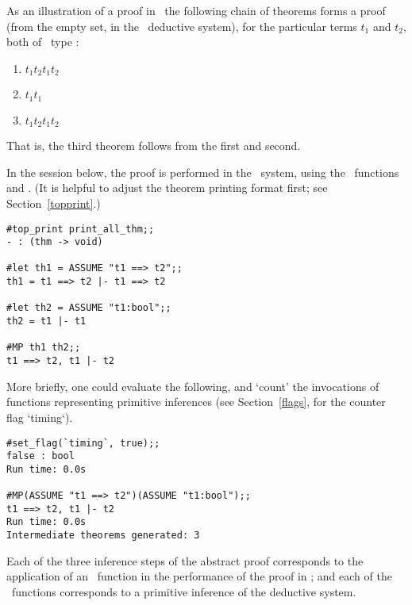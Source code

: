 As an illustration of a proof in \HOL\, the following chain of theorems
forms a proof (from the empty set, in the
\HOL\ deductive system), for the particular terms $t_1$ and $t_2$, both of \HOL\ type :

\begin{enumerate}
\item $t_1$\ml{ ==> }$t_2$\ml{ |- }$t_1$\ml{ ==> }$t_2$

\item $t_1$\ml{ |- }$t_1$

\item $t_1$\ml{ ==> }$t_2$\ml{, }$t_1$\ml{ |- }$t_2$
\end{enumerate}

\noindent That is, the third theorem follows from the first and second.

In the session below, the proof is performed in the \HOL\ system, 
using the \ML\ functions  and . (It is helpful to
adjust the theorem printing format first; see Section~\ref{topprint}.)

\setcounter{sessioncount}{1}
\begin{session}\begin{verbatim}
#top_print print_all_thm;;
- : (thm -> void)

#let th1 = ASSUME "t1 ==> t2";;
th1 = t1 ==> t2 |- t1 ==> t2

#let th2 = ASSUME "t1:bool";;
th2 = t1 |- t1

#MP th1 th2;;
t1 ==> t2, t1 |- t2
\end{verbatim}\end{session}

\noindent More briefly, one could evaluate the following, and `count' the
invocations of functions representing primitive inferences
(see Section~\ref{flags}, for the counter flag `timing`).

\begin{session}\begin{verbatim}
#set_flag(`timing`, true);;
false : bool
Run time: 0.0s

#MP(ASSUME "t1 ==> t2")(ASSUME "t1:bool");;
t1 ==> t2, t1 |- t2
Run time: 0.0s
Intermediate theorems generated: 3
\end{verbatim}\end{session}

\noindent Each of the three 
inference steps of the abstract proof
corresponds
to the application of an \ML\ function in the performance of the proof in \HOL; and each of the \ML\
functions corresponds to a primitive inference of the deductive
system. 

